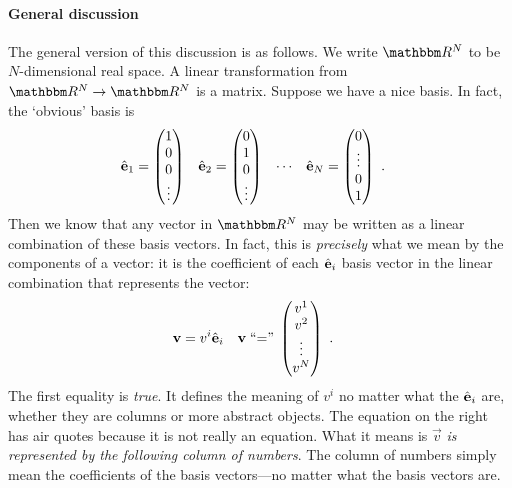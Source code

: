 \documentclass[12pt]{article}
\begin{document}
\paragraph{General discussion}
The general version of this discussion is as follows. We write $\RR ^N$ to be $N$-dimensional real space. A linear transformation from $\RR ^N \to \RR ^N$ is a matrix. Suppose we have a nice basis. In fact, the `obvious' basis is
\begin{align}
    {\hat{\mathbf{e}}}_1 &= 
    \begin{pmatrix}
        1 \\ 0 \\ 0 \\ \vdots
    \end{pmatrix}
    &
    {\hat{\mathbf{e}}}_2 &= 
    \begin{pmatrix}
        0 \\ 1 \\ 0 \\ \vdots
    \end{pmatrix}
    &
    \cdots &
    &
    {\hat{\mathbf{e}}}_N &= 
    \begin{pmatrix}
        0 \\ \vdots \\ 0 \\ 1
    \end{pmatrix} \ .
\end{align}
Then we know that any vector in $\RR ^N$ may be written as a linear combination of these basis vectors. In fact, this is \emph{precisely} what we mean by the components of a vector: it is the coefficient of each ${\hat{\mathbf{e}}}_i$ basis vector in the linear combination that represents the vector:
\begin{align}
    \mathbf{v} &= v^i{\hat{\mathbf{e}}}_i 
    &
    \mathbf{v} &\;\textnormal{``=''}\;
         \begin{pmatrix}
        v^1 \\ v^2 \\ \vdots \\ v^N
    \end{pmatrix} \ .
\end{align}
The first equality is \emph{true}. It defines the meaning of $v^i$ no matter what the ${\hat{\mathbf{e}}}_i$ are, whether they are columns or more abstract objects. The equation on the right has air quotes because it is not really an equation. What it means is $\vec{v}$ \emph{is represented by the following column of numbers}. The column of numbers simply mean the coefficients of the basis vectors---no matter what the basis vectors are.
\end{document}
